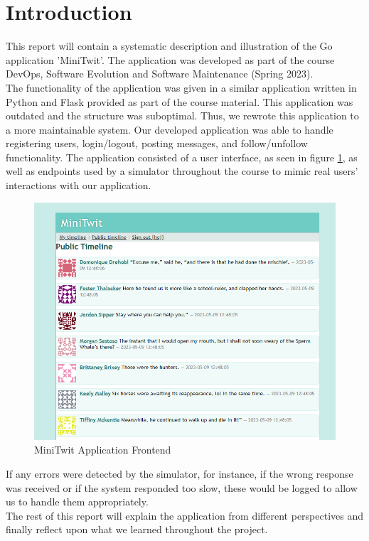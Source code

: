 \section{Introduction}
This report will contain a systematic description and illustration of the Go application 
'MiniTwit'. The application was developed as part of the course 
DevOps, Software Evolution and Software Maintenance (Spring 2023). \\

The functionality of the application was
given in a similar application written in Python and Flask provided as part of the course material. This
application was outdated and the structure was suboptimal. Thus, we rewrote this application to a more 
maintainable system. Our developed application was able to handle registering users, login/logout, 
posting messages, and follow/unfollow functionality. The application consisted of a user interface, 
as seen in figure \ref{fig:minitwit}, as well as endpoints used by a simulator throughout the course to 
mimic real users' interactions with our application.

\begin{figure}[H]
    \centering
    \captionsetup{justification=centering,margin=1cm}
    \includegraphics[width=0.8\linewidth]{report/images/minitwit.png}
    \caption{MiniTwit Application Frontend}
    \label{fig:minitwit}
\end{figure}

If any errors were detected by the simulator, for instance, if the wrong response was received or if the system
responded too slow, these would be logged to allow us to handle them appropriately.\\

The rest of this report will explain the application from different perspectives and finally reflect upon
what we learned throughout the project.